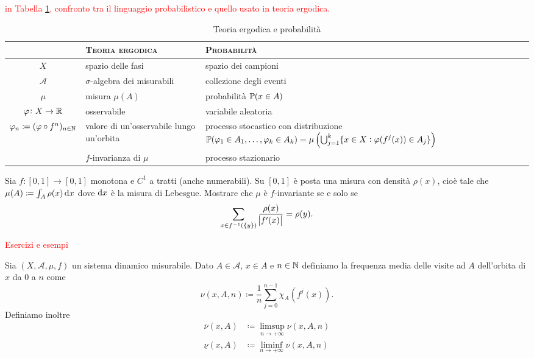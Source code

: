 \textcolor{red}{in Tabella \ref{tab:ergodica-vs-probabilia}, confronto tra il linguaggio probabilistico e quello usato in teoria ergodica.}
\begin{table}[h!]
    \centering
    \begin{tabularx}{\textwidth}{cXX}
        & \textsc{Teoria ergodica} & \textsc{Probabilità} \\ \toprule
        $ X $ & spazio delle fasi & spazio dei campioni \\
        $ \mathcal{A} $ & $ \sigma $-algebra dei misurabili & collezione degli eventi \\
        $ \mu $ & misura $ \mu(A) $ & probabilità $ \mathbb{P}{(x \in A)} $ \\
        $ \varphi \colon X \to \mathbb{R} $ & osservabile & variabile aleatoria \\
        $ \varphi_n \coloneqq (\varphi \circ f^{n})_{n \in \mathbb{N}} $ & valore di un'osservabile lungo un'orbita & processo stocastico con distribuzione  $ \mathbb{P}{(\varphi_1 \in A_1, \ldots, \varphi_k \in A_k)} =  \mu\left(\bigcup_{j = 1}^{k} \{x \in X : \varphi(f^{j}(x)) \in A_j\}\right) $ \\
        & $ f $-invarianza di $ \mu $ & processo stazionario \\ \bottomrule
    \end{tabularx}
    \caption{Teoria ergodica e probabilità}
    \label{tab:ergodica-vs-probabilia}
\end{table}

\begin{exercise}
    Sia $ f \colon [0, 1] \to [0, 1] $ monotona e $ C^1 $ a tratti (anche numerabili). Su $ [0, 1] $ è posta una misura con densità $ \rho(x) $, cioè tale che $ \mu(A) \coloneqq \int_A \rho(x) \dif{x} $ dove $ \dif{x} $ è la misura di Lebesgue. Mostrare che $ \mu $ è $ f $-invariante se e solo se
    \[
        \sum_{x \in f^{-1}(\{y\})} \frac{\rho(x)}{\abs{f'(x)}} = \rho(y).
    \]
\end{exercise}

\textcolor{red}{Esercizi e esempi}

\begin{definition}
    Sia $ (X, \mathcal{A}, \mu, f) $ un sistema dinamico misurabile. Dato $ A \in \mathcal{A} $, $ x \in A $ e $ n \in \mathbb{N} $ definiamo la frequenza media delle visite ad $ A $ dell'orbita di $ x $ da $ 0 $ a $ n $ come
    \[
        \nu(x, A, n) \coloneqq \frac{1}{n} \sum_{j = 0}^{n-1} \chi_A(f^{j}(x)).
    \]
    Definiamo inoltre
    \begin{align*}
        \overline{\nu}(x, A) & \coloneqq \limsup_{n \to +\infty} \nu(x, A, n) \\
        \underline{\nu}(x, A) & \coloneqq \liminf_{n \to +\infty} \nu(x, A, n)
    \end{align*}
\end{definition}